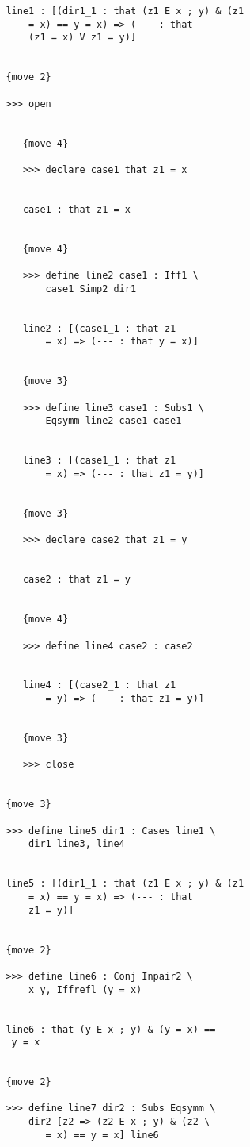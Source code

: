 \documentclass[12pt]{article}
\begin{document}
\begin{verbatim}
         line1 : [(dir1_1 : that (z1 E x ; y) & (z1 
             = x) == y = x) => (--- : that 
             (z1 = x) V z1 = y)]


         {move 2}

         >>> open


            {move 4}

            >>> declare case1 that z1 = x


            case1 : that z1 = x


            {move 4}

            >>> define line2 case1 : Iff1 \
                case1 Simp2 dir1


            line2 : [(case1_1 : that z1 
                = x) => (--- : that y = x)]


            {move 3}

            >>> define line3 case1 : Subs1 \
                Eqsymm line2 case1 case1


            line3 : [(case1_1 : that z1 
                = x) => (--- : that z1 = y)]


            {move 3}

            >>> declare case2 that z1 = y


            case2 : that z1 = y


            {move 4}

            >>> define line4 case2 : case2


            line4 : [(case2_1 : that z1 
                = y) => (--- : that z1 = y)]


            {move 3}

            >>> close


         {move 3}

         >>> define line5 dir1 : Cases line1 \
             dir1 line3, line4


         line5 : [(dir1_1 : that (z1 E x ; y) & (z1 
             = x) == y = x) => (--- : that 
             z1 = y)]


         {move 2}

         >>> define line6 : Conj Inpair2 \
             x y, Iffrefl (y = x)


         line6 : that (y E x ; y) & (y = x) == 
          y = x


         {move 2}

         >>> define line7 dir2 : Subs Eqsymm \
             dir2 [z2 => (z2 E x ; y) & (z2 \
                = x) == y = x] line6



\end{verbatim}
\end{document}
